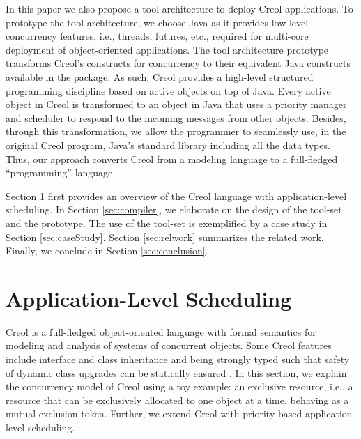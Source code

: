 In this paper we also propose a 
tool
architecture to deploy Creol applications. To prototype the tool
architecture, we choose Java as it provides low-level concurrency features, i.e., threads, futures, etc.,
required for multi-core deployment of object-oriented applications. The tool
architecture prototype transforms Creol's constructs for concurrency to their
equivalent Java constructs available in the
{} package. As such, Creol provides
a high-level structured programming discipline based on active objects on top of Java.
Every active object in Creol is transformed to an object in Java that uses a priority manager
and scheduler to respond to the incoming messages from other objects. Besides,
through this transformation, we allow the programmer to seamlessly use, in the
original Creol program, Java's standard library including all the data types.
Thus, our approach converts Creol from  a modeling language to a full-fledged
 ``programming'' language.

Section \ref{sec:creol} first provides an overview of the Creol language with application-level scheduling. 
In Section \ref{sec:compiler}, we elaborate on the design  of the tool-set and the
prototype. The use of the tool-set is exemplified by a case study in Section \ref{sec:caseStudy}.
Section \ref{sec:relwork} summarizes the related work. 
Finally, we conclude in Section \ref{sec:conclusion}.

%




\section{Application-Level Scheduling}
\label{sec:creol}

Creol \cite{creol:broch_owe} is a full-fledged object-oriented language with formal semantics for modeling and analysis of systems of concurrent objects. 
Some Creol features include interface and class inheritance and being strongly typed such that safety of dynamic class upgrades can be statically ensured \cite{yu06fmoods}.
In this section, we explain the concurrency model of Creol using a toy example: an exclusive resource, i.e., a
resource that can be exclusively allocated to one object at a time, behaving as a mutual exclusion token. 
Further, we extend Creol with priority-based application-level scheduling.

